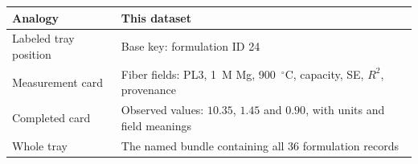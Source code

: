 \documentclass[11pt,letterpaper]{article}
\begin{document}
\begin{center}
\begin{tabular}{@{}p{}p{}@{}}
\toprule
Analogy & This dataset\\\midrule
Labeled tray position & Base key: formulation ID 24\\
Measurement card & Fiber fields: PL3, 1~M Mg, 900~$^\circ$C, capacity, SE, $R^2$, provenance\\
Completed card & Observed values: $10.35$, $1.45$ and $0.90$, with units and field meanings\\
Whole tray & The named bundle containing all 36 formulation records\\
\bottomrule
\end{tabular}
\end{center}
\end{document}
